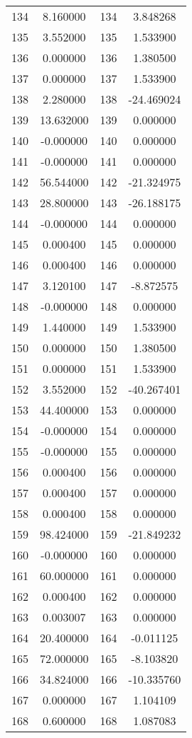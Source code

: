 \documentclass[12pt]{article}
\begin{document}
\begin{longtable}{@{}cccc@{}}
134 & 8.160000 & 134 & 3.848268 \\
135 & 3.552000 & 135 & 1.533900 \\
136 & 0.000000 & 136 & 1.380500 \\
137 & 0.000000 & 137 & 1.533900 \\
138 & 2.280000 & 138 & -24.469024 \\
139 & 13.632000 & 139 & 0.000000 \\
140 & -0.000000 & 140 & 0.000000 \\
141 & -0.000000 & 141 & 0.000000 \\
142 & 56.544000 & 142 & -21.324975 \\
143 & 28.800000 & 143 & -26.188175 \\
144 & -0.000000 & 144 & 0.000000 \\
145 & 0.000400 & 145 & 0.000000 \\
146 & 0.000400 & 146 & 0.000000 \\
147 & 3.120100 & 147 & -8.872575 \\
148 & -0.000000 & 148 & 0.000000 \\
149 & 1.440000 & 149 & 1.533900 \\
150 & 0.000000 & 150 & 1.380500 \\
151 & 0.000000 & 151 & 1.533900 \\
152 & 3.552000 & 152 & -40.267401 \\
153 & 44.400000 & 153 & 0.000000 \\
154 & -0.000000 & 154 & 0.000000 \\
155 & -0.000000 & 155 & 0.000000 \\
156 & 0.000400 & 156 & 0.000000 \\
157 & 0.000400 & 157 & 0.000000 \\
158 & 0.000400 & 158 & 0.000000 \\
159 & 98.424000 & 159 & -21.849232 \\
160 & -0.000000 & 160 & 0.000000 \\
161 & 60.000000 & 161 & 0.000000 \\
162 & 0.000400 & 162 & 0.000000 \\
163 & 0.003007 & 163 & 0.000000 \\
164 & 20.400000 & 164 & -0.011125 \\
165 & 72.000000 & 165 & -8.103820 \\
166 & 34.824000 & 166 & -10.335760 \\
167 & 0.000000 & 167 & 1.104109 \\
168 & 0.600000 & 168 & 1.087083 \\

\end{longtable}
\end{document}
